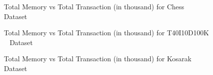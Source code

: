     \begin{figure}[h]
    \centering
        
    \caption{Total Memory vs Total Transaction (in thousand) for Chess ~\cite{dataset} Dataset }
    \label{result:g_chess_memory_node}
    \end{figure}
    
    \begin{figure}[h]
        
    \caption{Total Memory vs Total Transaction (in thousand) for T40I10D100K ~\cite{dataset} Dataset }
    \label{result:g_t10_memory_node}
    \end{figure}

    \begin{figure}[h]
    \centering
        
    \caption{Total Memory vs Total Transaction (in thousand) for Kosarak ~\cite{dataset} Dataset }
    \label{result:g_k_memory_node}
    \end{figure}
